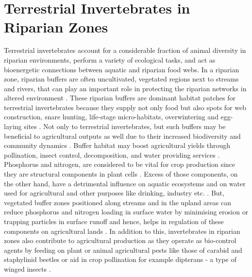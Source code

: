 \documentclass[12pt,a4wide]{report}
\numberwithin{equation}{chapter}
\numberwithin{theorem}{chapter}
\begin{document}
\section{Terrestrial Invertebrates in Riparian Zones}
Terrestrial invertebrates account for a considerable fraction of animal diversity in riparian environments, perform a variety of ecological tasks, and act as bioenergetic connections between aquatic and riparian food webs. In a riparian zone, riparian buffers are often uncultivated, vegetated regions next to streams and rivers, that can play an important role in protecting the riparian networks in altered environment \cite{burdon2020assessing}. These riparian buffers are dominant habitat patches for terrestrial invertebrates because they supply not only food but also spots for web construction, snare hunting, life-stage micro-habitats, overwintering and egg-laying sites \cite{popescu2021riparian}. Not only to terrestrial invertebrates, but such buffers may be beneficial to agricultural outputs as well due to their increased biodiversity and community dynamics \cite{forio2020small}. Buffer habitat may boost agricultural yields through pollination, insect control, decomposition, and water providing services \cite{luke2019}. Phosphorus and nitrogen, are considered to be vital for crop production since they are structural components in plant cells  \cite{sharma2017}. Excess of those components, on the other hand, have a detrimental influence on aquatic ecosystems and on water used for agricultural and other purposes like drinking, industry etc. \cite{carpenter1998}. But, vegetated buffer zones positioned along streams and in the upland areas can reduce phosphorus and nitrogen loading in surface water by minimising erosion or trapping particles in surface runoff and hence, helps in regulation of these components on agricultural lands \cite{vought1995}. In addition to this, invertebrates in riparian zones also contribute to agricultural production as they operate as bio-control agents by feeding on plant or animal agricultural pests like those of carabid and staphylinid beetles \cite{andersen2000long} or aid in crop pollination for example dipterans - a type of winged insects \cite{ssymank2008pollinating}.  \\
\end{document}
